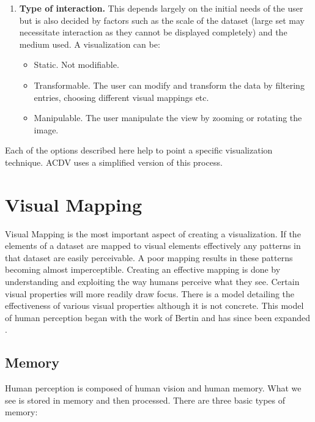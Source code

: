 \documentclass[a4paper, 11pt, titlepage, onehalfspacing]{report}
\begin{document}
\begin{enumerate}
  \item \textbf{Type of interaction.} This depends largely on the initial needs of the user but is also decided by factors such as the scale of the dataset (large set may necessitate interaction as they cannot be displayed completely) and the medium used. A visualization can be:
  \begin{itemize}
    \item Static. Not modifiable.
    \item Transformable. The user can modify and transform the data by filtering entries, choosing different visual mappings etc.
  \item Manipulable. The user manipulate the view by zooming or rotating the image.
  \end{itemize}


\end{enumerate}

Each of the options described here help to point a specific visualization technique. AC\lightning{}DV uses a simplified version of this process.



\section{Visual Mapping}
\label{section:VMapping}
Visual Mapping is the most important aspect of creating a visualization. If the elements of a dataset are mapped to visual elements effectively any patterns in that dataset are easily perceivable. A poor mapping results in these patterns becoming almost imperceptible. Creating an effective mapping is done by understanding and exploiting the way humans perceive what they see. Certain visual properties will more readily draw focus. There is a model detailing the effectiveness of various visual properties although it is not concrete. This model of human perception began with the work of Bertin \cite{bertin1973semiologie} and has since been expanded \cite{card1999readings} \cite{few2004show}.

\subsection{Memory}
Human perception is composed of human vision and human memory. What we see is stored in memory and then processed. There are three basic types of memory:
\end{document}
